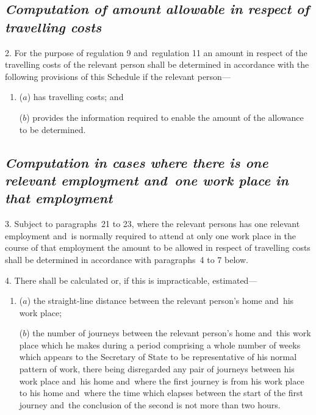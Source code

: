 \documentclass[12pt,a4paper]{article}
\begin{document}

\subsection*{\itshape Computation of amount allowable in respect of travelling costs}

2.  For the purpose of regulation 9 and~regulation 11 an amount in respect of the travelling costs of the relevant person shall be determined in accordance with the following provisions of this Schedule if the relevant person—
\begin{enumerate}\item[]
($a$) has travelling costs; and

($b$) provides the information required to enable the amount of the allowance to be determined.
\end{enumerate}

\subsection*{\itshape Computation in cases where there is one relevant employment and~one work place in that employment}

3.  Subject to paragraphs~21 to 23, where the relevant persons has one relevant employment and~is normally required to attend at only one work place in the course of that employment the amount to be allowed in respect of travelling costs shall be determined in accordance with paragraphs~4 to 7 below.

\medskip

4.  There shall be calculated or, if this is impracticable, estimated—
\begin{enumerate}\item[]
($a$) the straight-line distance between the relevant person’s home and~his work place;

($b$) the number of journeys between the relevant person’s home and~this work place which he makes during a period comprising a whole number of weeks which appears to the 
Secretary of State  %
to be representative of his normal pattern of work, there being disregarded any pair of journeys between his work place and~his home and~where the first journey is from his work place to his home and~where the time which elapses between the start of the first journey and~the conclusion of the second is not more than two hours.
\end{enumerate}
\end{document}

